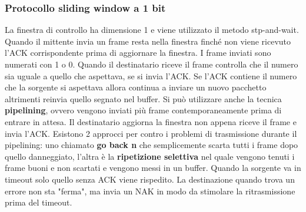 \subsubsection{Protocollo sliding window a 1 bit}
La finestra di controllo ha dimensione 1 e viene utilizzato il metodo stp-and-wait. Quando il mittente invia un frame resta nella finestra finché non viene ricevuto l'ACK corrispondente prima di aggiornare la finestra. I frame inviati sono numerati con 1 o 0. Quando il destinatario riceve il frame controlla che il numero sia uguale a quello che aspettava, se si invia l'ACK. Se l'ACK contiene il numero che la sorgente si aspettava allora continua a inviare un nuovo pacchetto altrimenti reinvia quello segnato nel buffer. Si può utilizzare anche la tecnica \textbf{pipelining}, ovvero vengono inviati più frame contemporaneamente prima di entrare in attesa. Il destinatario aggiorna la finestra non appena riceve il frame e invia l'ACK. Esistono 2 approcci per contro i problemi di trasmissione durante il pipelining: uno chiamato \textbf{go back n} che semplicemente scarta tutti i frame dopo quello danneggiato, l'altra è la \textbf{ripetizione selettiva} nel quale vengono tenuti i frame buoni e non scartati e vengono messi in un buffer. Quando la sorgente va in timeout solo quello senza ACK viene rispedito. La destinazione quando trova un errore non sta "ferma", ma invia un NAK in modo da stimolare la ritrasmissione prima del timeout.

